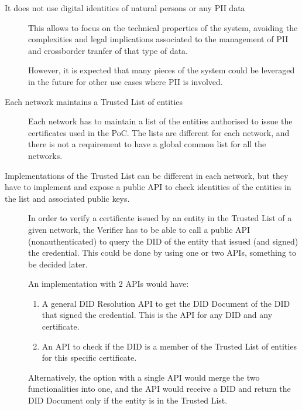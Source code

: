 \documentclass[a4paper,12pt,english]{sphinxhowto}
\begin{document}
\begin{description}
\item[{It does not use digital identities of natural persons or any PII data}] \leavevmode
\sphinxAtStartPar
This allows to focus on the technical properties of the system, avoiding the complexities and legal implications associated to the management of PII and crossborder tranfer of that type of data.

\sphinxAtStartPar
However, it is expected that many pieces of the system could be leveraged in the future for other use cases where PII is involved.

\item[{Each network maintains a Trusted List of entities}] \leavevmode
\sphinxAtStartPar
Each network has to maintain a list of the entities authorised to issue the certificates used in the PoC. The lists are different for each network, and there is not a requirement to have a global common list for all the networks.

\item[{Implementations of the Trusted List can be different in each network, but they have to implement and expose a public API to check identities of the entities in the list and associated public keys.}] \leavevmode
\sphinxAtStartPar
In order to verify a certificate issued by an entity in the Trusted List of a given network, the Verifier has to be able to call a public API (non\sphinxhyphen{}authenticated) to query the DID of the entity that issued (and signed) the credential. This could be done by using one or two APIs, something to be decided later.

\sphinxAtStartPar
An implementation with 2 APIs would have:
\begin{enumerate}
%
\item {} 
\sphinxAtStartPar
A general DID Resolution API to get the DID Document of the DID that signed the credential. This is the API for any DID and any certificate.

\item {} 
\sphinxAtStartPar
An API to check if the DID is a member of the Trusted List of entities for this specific certificate.

\end{enumerate}

\sphinxAtStartPar
Alternatively, the option with a single API would merge the two functionalities into one, and the API would receive a DID and return the DID Document only if the entity is in the Trusted List.


\end{description}
\end{document}
